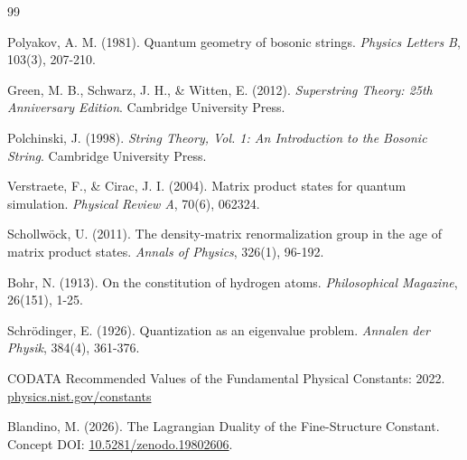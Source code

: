 \documentclass[12pt]{article}
\begin{document}

\begin{thebibliography}{99}

Polyakov, A. M. (1981). Quantum geometry of bosonic strings.
\textit{Physics Letters B}, 103(3), 207-210.

Green, M. B., Schwarz, J. H., \& Witten, E. (2012).
\textit{Superstring Theory: 25th Anniversary Edition}. Cambridge University Press.

Polchinski, J. (1998). \textit{String Theory, Vol. 1: An Introduction to the Bosonic String}.
Cambridge University Press.

Verstraete, F., \& Cirac, J. I. (2004). Matrix product states for quantum simulation.
\textit{Physical Review A}, 70(6), 062324.

Schollwöck, U. (2011). The density-matrix renormalization group in the age of matrix
product states. \textit{Annals of Physics}, 326(1), 96-192.

Bohr, N. (1913). On the constitution of hydrogen atoms.
\textit{Philosophical Magazine}, 26(151), 1-25.

Schrödinger, E. (1926). Quantization as an eigenvalue problem.
\textit{Annalen der Physik}, 384(4), 361-376.

CODATA Recommended Values of the Fundamental Physical Constants: 2022.
\href{https://physics.nist.gov/constants}{physics.nist.gov/constants}

Blandino, M. (2026). The Lagrangian Duality of the Fine-Structure Constant.
Concept DOI: \href{https://doi.org/10.5281/zenodo.19802606}{10.5281/zenodo.19802606}.

\end{thebibliography}
\end{document}
